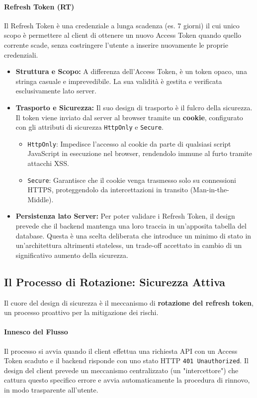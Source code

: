 \documentclass[12pt,a4paper,openright,twoside]{book}
\begin{document}
\paragraph{Refresh Token (RT)}
Il Refresh Token è una credenziale a lunga scadenza (es. 7 giorni) il cui unico scopo è permettere al client di ottenere un nuovo Access Token quando quello corrente scade, senza costringere l'utente a inserire nuovamente le proprie credenziali.
\begin{itemize}
    \item \textbf{Struttura e Scopo:} A differenza dell'Access Token, è un token opaco, una stringa casuale e imprevedibile. La sua validità è gestita e verificata esclusivamente lato server.
    \item \textbf{Trasporto e Sicurezza:} Il suo design di trasporto è il fulcro della sicurezza. Il token viene inviato dal server al browser tramite un \textbf{cookie}, configurato con gli attributi di sicurezza \texttt{HttpOnly} e \texttt{Secure}.
    \begin{itemize}
        \item \texttt{HttpOnly}: Impedisce l'accesso al cookie da parte di qualsiasi script JavaScript in esecuzione nel browser, rendendolo immune al furto tramite attacchi XSS.
        \item \texttt{Secure}: Garantisce che il cookie venga trasmesso solo su connessioni HTTPS, proteggendolo da intercettazioni in transito (Man-in-the-Middle).
    \end{itemize}
    \item \textbf{Persistenza lato Server:} Per poter validare i Refresh Token, il design prevede che il backend mantenga una loro traccia in un'apposita tabella del database. Questa è una scelta deliberata che introduce un minimo di stato in un'architettura altrimenti stateless, un trade-off accettato in cambio di un significativo aumento della sicurezza.
\end{itemize}

\subsection{Il Processo di Rotazione: Sicurezza Attiva}
Il cuore del design di sicurezza è il meccanismo di \textbf{rotazione del refresh token}, un processo proattivo per la mitigazione dei rischi.

\paragraph{Innesco del Flusso} Il processo si avvia quando il client effettua una richiesta API con un Access Token scaduto e il backend risponde con uno stato HTTP \texttt{401 Unauthorized}. Il design del client prevede un meccanismo centralizzato (un "intercettore") che cattura questo specifico errore e avvia automaticamente la procedura di rinnovo, in modo trasparente all'utente.
\end{document}
